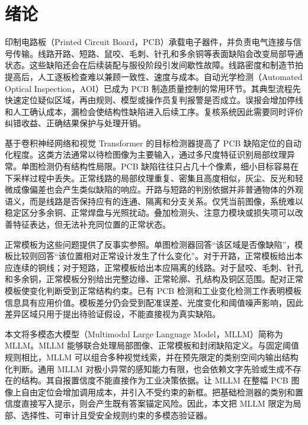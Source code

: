 \section{绪论}
\label{sec:introduction}

印制电路板（Printed Circuit Board，PCB）承载电子器件，并负责电气连接与信号传输。线路开路、短路、鼠咬、毛刺、针孔和多余铜等表面缺陷会改变局部导通状态。这些缺陷还会在后续装配与服役阶段引发间歇性故障。线路密度和制造节拍提高后，人工逐板检查难以兼顾一致性、速度与成本。自动光学检测（Automated Optical Inspection，AOI）已成为 PCB 制造质量控制的常用环节。其典型流程先快速定位疑似区域，再由规则、模型或操作员复判报警是否成立\cite{deng2018autovrs,chen2023pcbreview}。误报会增加停线和人工确认成本，漏检会使结构性缺陷进入后续工序。复核系统因此需要同时评价纠错收益、正确结果保护与处理开销。

基于卷积神经网络和视觉 Transformer 的目标检测器提高了 PCB 缺陷定位的自动化程度\cite{tang2019deeppcb,chen2023pcbreview}。这类方法通常以待检图像为主要输入，通过多尺度特征识别局部纹理异常。单图检测仍有结构性局限。PCB 缺陷往往只占几十个像素，细小目标容易在下采样过程中丢失。正常线路的局部纹理重复、密集且高度相似，灰尘、反光和轻微成像偏差也会产生类似缺陷的响应。开路与短路的判别依据并非普通物体的外观语义，而是线路是否保持应有的连通、隔离和分支关系。仅凭当前图像，系统难以稳定区分多余铜、正常焊盘与光照扰动。叠加检测头、注意力模块或损失项可以改善特征表达，但无法补充同位置的正常状态。

正常模板为这些问题提供了反事实参照。单图检测器回答“该区域是否像缺陷”，模板比较则回答“该位置相对正常设计发生了什么变化”。对于开路，正常模板给出本应连续的铜线；对于短路，正常模板给出本应隔离的线路。对于鼠咬、毛刺、针孔和多余铜，正常模板分别给出完整边缘、正常轮廓、孔结构及铜区范围。配对正常模板使变化判断受到正常结构约束。已有 PCB 检测和工业变化检测工作表明模板信息具有应用价值\cite{tang2019deeppcb,fridman2021changechip}。模板差分仍会受到配准误差、光度变化和阈值噪声影响，因此差异区域只用于提出待验证假设，不能直接视为真实缺陷。

本文将多模态大模型（Multimodal Large Language Model，MLLM）简称为 MLLM。MLLM 能够联合处理局部图像、正常模板和封闭缺陷定义\cite{jiang2025mmad,xu2025anomalyov,andrade2026agreementbias}。与固定阈值规则相比，MLLM 可以组合多种视觉线索，并在预先限定的类别空间内输出结构化判断。通用 MLLM 对极小异常的感知能力有限，也会依赖文字先验或生成不存在的结构。其自报置信度不能直接作为工业决策依据。让 MLLM 在整幅 PCB 图像上自由定位会增加调用成本，并引入不受约束的新框。把基础检测器的类别和置信度直接写入提示，则会产生既有答案锚定风险。因此，本文把 MLLM 限定为局部、选择性、可审计且受安全规则约束的多模态验证器。

